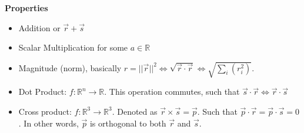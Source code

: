 \documentclass{article}
\newtheorem{one minute paper}[theorem]{One Minute Paper}
\begin{document}
\textbf{Properties}
\begin{itemize}
    \item Addition or $\vec{r} + \vec{s}$
    \item Scalar Multiplication for some $a \in \mathbb{R}$
    \item Magnitude (norm), basically $r = ||\vec{r}||^2 \iff \sqrt{\vec{r} \cdot \vec{r}} \iff \sqrt{\sum_i(r_i^2)}$.
    \item Dot Product: $f : \mathbb{R}^n \rightarrow \mathbb{R}$. This operation commutes, such that $\vec{s} \cdot \vec{r} \iff \vec{r} \cdot \vec{s}$
    \item Cross product: $f : \mathbb{R}^3 \rightarrow \mathbb{R}^3$. Denoted as $\vec{r} \times \vec{s} = \vec{p}$. Such that $\vec{p} \cdot \vec{r} = \vec{p} \cdot \vec{s} = 0$. In other words, $\vec{p}$ is orthogonal to both $\vec{r}$ and $\vec{s}$. 
\end{itemize}
\end{document}
